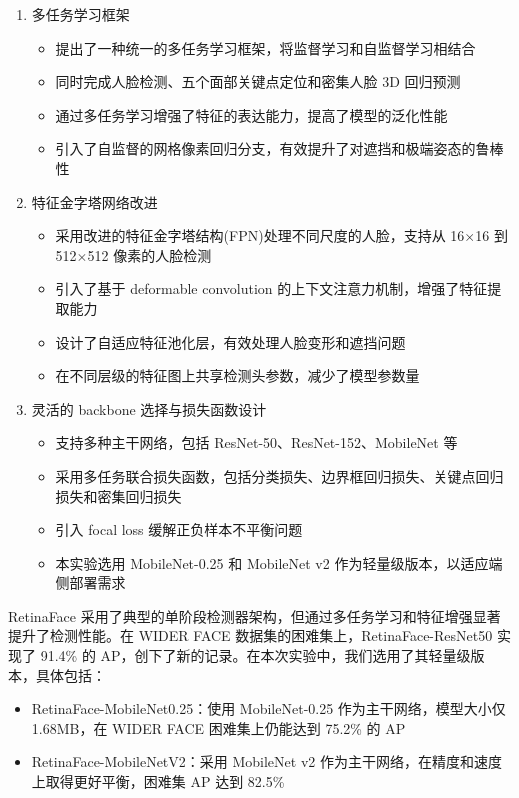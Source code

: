 \documentclass{article}
\begin{document}
\begin{enumerate}
    \item 多任务学习框架
    \begin{itemize}
        \item 提出了一种统一的多任务学习框架，将监督学习和自监督学习相结合
        \item 同时完成人脸检测、五个面部关键点定位和密集人脸 3D 回归预测
        \item 通过多任务学习增强了特征的表达能力，提高了模型的泛化性能
        \item 引入了自监督的网格像素回归分支，有效提升了对遮挡和极端姿态的鲁棒性
    \end{itemize}
    
    \item 特征金字塔网络改进
    \begin{itemize}
        \item 采用改进的特征金字塔结构(FPN)处理不同尺度的人脸，支持从 16$\times$16 到 512$\times$512 像素的人脸检测
        \item 引入了基于 deformable convolution 的上下文注意力机制，增强了特征提取能力
        \item 设计了自适应特征池化层，有效处理人脸变形和遮挡问题
        \item 在不同层级的特征图上共享检测头参数，减少了模型参数量
    \end{itemize}
    
    \item 灵活的 backbone 选择与损失函数设计
    \begin{itemize}
        \item 支持多种主干网络，包括 ResNet-50、ResNet-152、MobileNet 等
        \item 采用多任务联合损失函数，包括分类损失、边界框回归损失、关键点回归损失和密集回归损失
        \item 引入 focal loss 缓解正负样本不平衡问题
        \item 本实验选用 MobileNet-0.25 和 MobileNet v2 作为轻量级版本，以适应端侧部署需求
    \end{itemize}
\end{enumerate}

RetinaFace 采用了典型的单阶段检测器架构，但通过多任务学习和特征增强显著提升了检测性能。在 WIDER FACE 数据集的困难集上，RetinaFace-ResNet50 实现了 91.4\% 的 AP，创下了新的记录。在本次实验中，我们选用了其轻量级版本，具体包括：
\begin{itemize}
    \item RetinaFace-MobileNet0.25：使用 MobileNet-0.25 作为主干网络，模型大小仅 1.68MB，在 WIDER FACE 困难集上仍能达到 75.2\% 的 AP
    \item RetinaFace-MobileNetV2：采用 MobileNet v2 作为主干网络，在精度和速度上取得更好平衡，困难集 AP 达到 82.5\%
\end{itemize}
\end{document}
